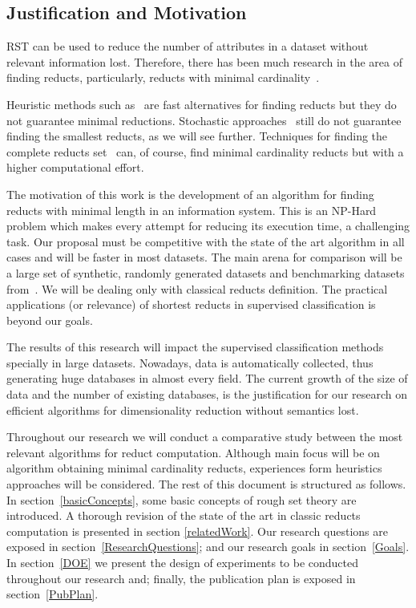\documentclass[11pt]{article}   %
\begin{document}
\subsection{Justification and Motivation}\label{Justification}{
  RST can be used to reduce the number of attributes in a dataset without relevant information lost. 
  Therefore, there has been much research in the area of finding reducts, particularly, reducts with 
  minimal cardinality~\cite{Jensen14}. 
  
  Heuristic methods such as~\cite{Chouchoulas01,Jensen04,Lin04,Zhong01} are fast alternatives for finding 
  reducts but they do not guarantee minimal reductions. Stochastic approaches~\cite{Wroblewski95,Jensen03,
  Chen10,Wang07} still do not guarantee finding the smallest reducts, as we will see further. Techniques 
  for finding the complete reducts set~\cite{Ruiz85,Santiesteban03,Sanchez07,Lias09} can, of course, find 
  minimal cardinality reducts but with a higher computational effort.
  
  The motivation of this work is the development of an algorithm for finding reducts with minimal length 
  in an information system. This is an NP-Hard problem which makes every attempt for reducing its execution
  time, a challenging task. Our proposal must be competitive with the state of the art algorithm in all 
  cases and will be faster in most datasets. The main arena for comparison will be a large set of synthetic,
  randomly generated datasets and benchmarking datasets from~\cite{Bache13}. We will be dealing only with
  classical reducts definition. The practical applications (or relevance) of shortest reducts in supervised
  classification is beyond our goals.
  
  The results of this research will impact the supervised classification methods specially in large datasets.
  Nowadays, data is automatically collected, thus generating huge databases in almost every field. The 
  current growth of the size of data and the number of existing databases, is the justification for our
  research on efficient algorithms for dimensionality reduction without semantics lost.}  
    
  Throughout our research we will conduct a comparative study between the most relevant algorithms for reduct 
  computation. Although main focus will be on algorithm obtaining minimal cardinality reducts, experiences 
  form heuristics approaches will be considered. The rest of this document is structured as follows. In 
  section~\ref{basicConcepts}, some basic concepts of rough set theory are introduced. A thorough revision of 
  the state of the art in classic reducts computation is presented in section \ref{relatedWork}. Our research
  questions are exposed in section~\ref{ResearchQuestions}; and our research goals in section~\ref{Goals}.
  In section~\ref{DOE} we present the design of experiments to be conducted throughout our research and;
  finally, the publication plan is exposed in section~\ref{PubPlan}.
  
\end{document}
